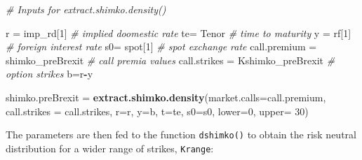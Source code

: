 \documentclass[]{book}
\newenvironment{Shaded}{\begin{snugshade}}{\end{snugshade}}
\newcommand{\KeywordTok}[1]{\textcolor[rgb]{0.13,0.29,0.53}{\textbf{#1}}}
\newcommand{\DataTypeTok}[1]{\textcolor[rgb]{0.13,0.29,0.53}{#1}}
\newcommand{\DecValTok}[1]{\textcolor[rgb]{0.00,0.00,0.81}{#1}}
\newcommand{\StringTok}[1]{\textcolor[rgb]{0.31,0.60,0.02}{#1}}
\newcommand{\CommentTok}[1]{\textcolor[rgb]{0.56,0.35,0.01}{\textit{#1}}}
\newcommand{\OperatorTok}[1]{\textcolor[rgb]{0.81,0.36,0.00}{\textbf{#1}}}
\newcommand{\NormalTok}[1]{#1}
\theoremstyle{definition}
\theoremstyle{definition}
\theoremstyle{definition}
\theoremstyle{remark}
\begin{document}
\begin{Shaded}
\begin{Highlighting}[]
\CommentTok{# Inputs for extract.shimko.density()}

\NormalTok{r =}\StringTok{ }\NormalTok{imp_rd[}\DecValTok{1}\NormalTok{]                      }\CommentTok{# implied doomestic rate}
\NormalTok{te=}\StringTok{ }\NormalTok{Tenor                          }\CommentTok{# time to  maturity}
\NormalTok{y =}\StringTok{ }\NormalTok{rf[}\DecValTok{1}\NormalTok{]                          }\CommentTok{# foreign interest rate}
\NormalTok{s0=}\StringTok{ }\NormalTok{spot[}\DecValTok{1}\NormalTok{]                        }\CommentTok{# spot exchange rate}
\NormalTok{call.premium =}\StringTok{ }\NormalTok{shimko_preBrexit    }\CommentTok{# call premia values}
\NormalTok{call.strikes =}\StringTok{ }\NormalTok{Kshimko_preBrexit   }\CommentTok{# option strikes}
\NormalTok{b=r}\OperatorTok{-}\NormalTok{y}

\NormalTok{shimko.preBrexit =}\StringTok{ }\KeywordTok{extract.shimko.density}\NormalTok{(}\DataTypeTok{market.calls=}\NormalTok{call.premium, }\DataTypeTok{call.strikes =}\NormalTok{ call.strikes, }
                                   \DataTypeTok{r=}\NormalTok{r, }\DataTypeTok{y=}\NormalTok{b, }\DataTypeTok{t=}\NormalTok{te, }\DataTypeTok{s0=}\NormalTok{s0, }\DataTypeTok{lower=}\DecValTok{0}\NormalTok{, }\DataTypeTok{upper=} \DecValTok{30}\NormalTok{)}
\end{Highlighting}
\end{Shaded}

The parameters are then fed to the function \texttt{dshimko()} to obtain
the risk neutral distribution for a wider range of strikes,
\texttt{Krange}:

\begin{Shaded}
\end{Shaded}
\end{document}
